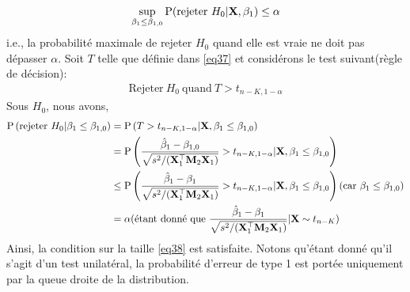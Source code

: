 \begin{align}
\underset{\beta_1\leq\beta_{1,0}}{\sup}\operatorname{P}(\textrm{rejeter} \ H_0 | \mathbf X, \beta_1) \leq \alpha
\label{eq38}
\end{align}
i.e., la probabilité maximale de rejeter $H_0$ quand elle est vraie ne doit pas dépasser $\alpha$. Soit $T$ telle que définie dans \eqref{eq37} et considérons le test suivant(règle de décision):
\begin{align*}
\textrm{Rejeter}  \ H_0 \ \textrm{quand}  \ T > t_{n-K, 1-\alpha}
\end{align*}
Sous $H_0$, nous avons,
\begin{align*}
\operatorname{P}\left(\textrm{rejeter} \ H_0 | \beta_1 \leq \beta_{1,0}  \right)&=\operatorname{P}\left(T >  t_{n-K, 1-\alpha} | \mathbf X, \beta_1 \leq \beta_{1,0}\right)\\
&=\operatorname{P}\left( 
\frac{\hat{\beta}_1 - \beta_{1,0}}{\sqrt{s^2/(\mathbf X_1^\top\mathbf M_2\mathbf X_1)}} >  t_{n-K, 1-\alpha} | \mathbf X, \beta_1 \leq \beta_{1,0}\right)\\
&\leq
\operatorname{P}\left( 
\frac{\hat{\beta}_1 - \beta_1}{\sqrt{s^2/(\mathbf X_1^\top\mathbf M_2\mathbf X_1)}} >  t_{n-K, 1-\alpha} | \mathbf X, \beta_1 \leq \beta_{1,0}\right)(\textrm{car}  \  \beta_1 \leq \beta_{1,0})\\
&=\alpha( \textrm{étant donné que} \  \frac{\hat{\beta}_1 - \beta_1}{\sqrt{s^2/(\mathbf X_1^\top\mathbf M_2\mathbf X_1)}} | \mathbf X \sim t_{n-K}  )
\end{align*}
Ainsi, la condition sur la taille \eqref{eq38} est satisfaite. Notons qu'étant donné qu'il s'agit d'un test unilatéral, la probabilité d'erreur de type 1 est portée uniquement par la queue droite de la distribution.
